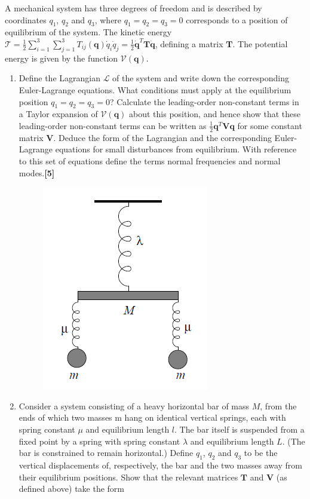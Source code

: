 \documentclass[a4paper]{article}
\begin{document}
\begin{qns}
A mechanical system has three degrees of freedom and is described by coordinates $q_1$, $q_2$ and $q_3$, where $q_1 = q_2 = q_3 = 0$ corresponds to a position of equilibrium of the system. The kinetic energy $\mathcal{T}=\frac{1}{2}\sum_{i=1}^3\sum_{j=1}^3T_{ij}(\mathbf{q})\dot{q}_i\dot{q}_j=\frac{1}{2}\mathbf{\dot{q}}^T\mathbf{T}\mathbf{\dot{q}}$, defining a matrix $\mathbf{T}$. The potential energy is given by the function $\mathcal{V}(\mathbf{q})$.
\begin{enumerate}[label=(\roman*)]
\item Define the Lagrangian $\mathcal{L}$ of the system and write down the corresponding Euler-Lagrange equations. What conditions must apply at the equilibrium position $q_1=q_2=q_3=0$? Calculate the leading-order non-constant terms in a Taylor expansion of $\mathcal{V}(\mathbf{q})$ about this position, and hence show that these leading-order non-constant terms can be written as $\frac{1}{2}\mathbf{q}^T\mathbf{V}\mathbf{q}$ for some constant matrix $\mathbf{V}$. Deduce the form of the Lagrangian and the corresponding Euler-Lagrange equations for small disturbances from equilibrium. With reference to this set of equations define the terms normal frequencies and normal modes.\hfill\textbf{[5]}
\begin{figure}[H]
    \centering
    \includegraphics[scale=0.8]{2011P2Q7.PNG}
\end{figure}
\item Consider a system consisting of a heavy horizontal bar of mass $M$, from the ends of which two masses m hang on identical vertical springs, each with spring constant $\mu$ and equilibrium length $l$. The bar itself is suspended from a fixed point by a spring with spring constant $\lambda$ and equilibrium length $L$. (The bar is constrained to remain horizontal.) Define $q_1$, $q_2$ and $q_3$ to be the vertical displacements of, respectively, the bar and the two masses away from their equilibrium positions. Show that the relevant matrices $\mathbf{T}$ and $\mathbf{V}$ (as defined above) take the form

\end{enumerate}
\end{qns}
\end{document}
